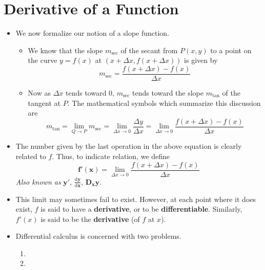 \documentclass[../main.tex]{subfiles}
\begin{document}
\section{Derivative of a Function}
\begin{itemize}
    \item We now formalize our notion of a slope function.
    \begin{itemize}
        \item We know that the slope $m_\text{sec}$ of the secant from $P(x,y)$ to a point on the curve $y=f(x)$ at $(x+\Delta x,f(x+\Delta x))$ is given by
        \begin{equation*}
            m_\text{sec} = \frac{f(x+\Delta x)-f(x)}{\Delta x}
        \end{equation*}
        \item Now as $\Delta x$ tends toward 0, $m_\text{sec}$ tends toward the slope $m_\text{tan}$ of the tangent at $P$. The mathematical symbols which summarize this discussion are
        \begin{equation*}
            m_\text{tan} = \lim_{Q\to P}m_\text{sec}
            = \lim_{\Delta x\to 0}\frac{\Delta y}{\Delta x}
            = \lim_{\Delta x\to 0}\frac{f(x+\Delta x)-f(x)}{\Delta x}
        \end{equation*}
    \end{itemize}
    \item The number given by the last operation in the above equation is clearly related to $f$. Thus, to indicate relation, we define
    \begin{equation*}
        \bm{f'(x)} = \lim_{\Delta x\to 0}\frac{f(x+\Delta x)-f(x)}{\Delta x}
    \end{equation*}
    \emph{Also known as} $\bm{y'}$, $\bm{\frac{\mathrm{d}y}{\mathrm{d}x}}$, $\bm{D_xy}$.
    \item This limit may sometimes fail to exist. However, at each point where it does exist, $f$ is said to have a \textbf{derivative}, or to be \textbf{differentiable}. Similarly, $f'(x)$ is said to be the \textbf{derivative} (of $f$ at $x$).
    \item Differential calculus is concerned with two problems.
    \begin{enumerate}
        \item {}
        \item {}

\end{enumerate}
\end{itemize}
\end{document}
